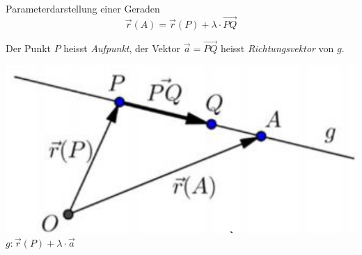 \begin{minipage}{0.6\linewidth}
    \begin{definition}{Parameterdarstellung} einer Geraden
        $$\overrightarrow{r}(A) = \overrightarrow{r}(P) + \lambda \cdot \overrightarrow{PQ}$$
    
        {\small Der Punkt $P$ heisst \textit{Aufpunkt}, der Vektor $\overrightarrow{a} = \overrightarrow{PQ}$ heisst \textit{Richtungsvektor} von $g$.}
    \end{definition}
\end{minipage}
\begin{minipage}{0.4\linewidth}
    \includegraphics[width=1\linewidth]{gerade.png}\\
    $g: \overrightarrow{r}(P) + \lambda \cdot \overrightarrow{a}$
\end{minipage}


